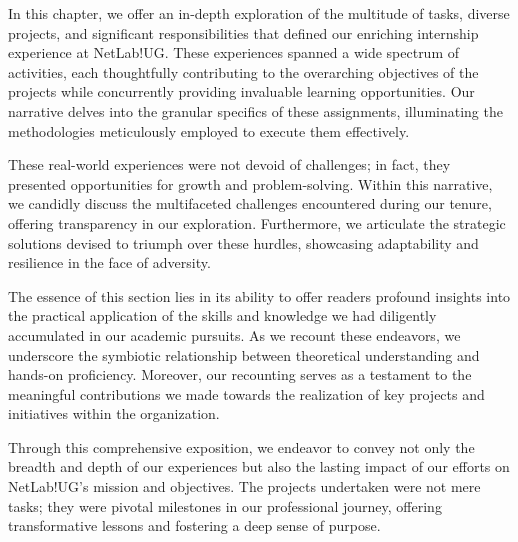 In this chapter, we offer an in-depth exploration of the multitude of tasks, diverse projects, and significant responsibilities that defined our enriching internship experience at NetLab!UG. These experiences spanned a wide spectrum of activities, each thoughtfully contributing to the overarching objectives of the projects while concurrently providing invaluable learning opportunities. Our narrative delves into the granular specifics of these assignments, illuminating the methodologies meticulously employed to execute them effectively.

These real-world experiences were not devoid of challenges; in fact, they presented opportunities for growth and problem-solving. Within this narrative, we candidly discuss the multifaceted challenges encountered during our tenure, offering transparency in our exploration. Furthermore, we articulate the strategic solutions devised to triumph over these hurdles, showcasing adaptability and resilience in the face of adversity.

The essence of this section lies in its ability to offer readers profound insights into the practical application of the skills and knowledge we had diligently accumulated in our academic pursuits. As we recount these endeavors, we underscore the symbiotic relationship between theoretical understanding and hands-on proficiency. Moreover, our recounting serves as a testament to the meaningful contributions we made towards the realization of key projects and initiatives within the organization.

Through this comprehensive exposition, we endeavor to convey not only the breadth and depth of our experiences but also the lasting impact of our efforts on NetLab!UG's mission and objectives. The projects undertaken were not mere tasks; they were pivotal milestones in our professional journey, offering transformative lessons and fostering a deep sense of purpose.




















